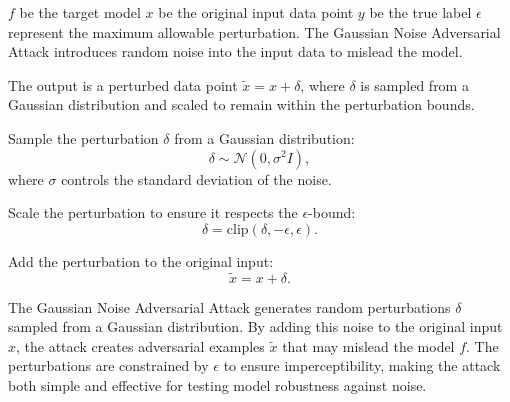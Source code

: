 \( f \) be the target model
\( x \) be the original input data point
\( y \) be the true label
\( \epsilon \) represent the maximum allowable perturbation. The Gaussian Noise Adversarial Attack introduces random noise into the input data to mislead the model.

The output is a perturbed data point \( \tilde{x} = x + \delta \), where \( \delta \) is sampled from a Gaussian distribution and scaled to remain within the perturbation bounds.

Sample the perturbation \( \delta \) from a Gaussian distribution:
   \[
   \delta \sim \mathcal{N}(0, \sigma^2 I),
   \]
   where \( \sigma \) controls the standard deviation of the noise.

Scale the perturbation to ensure it respects the \( \epsilon \)-bound:
   \[
   \delta = \text{clip}(\delta, -\epsilon, \epsilon).
   \]

Add the perturbation to the original input:
   \[
   \tilde{x} = x + \delta.
   \]

The Gaussian Noise Adversarial Attack generates random perturbations \( \delta \) sampled from a Gaussian distribution. By adding this noise to the original input \( x \), the attack creates adversarial examples \( \tilde{x} \) that may mislead the model \( f \). The perturbations are constrained by \( \epsilon \) to ensure imperceptibility, making the attack both simple and effective for testing model robustness against noise.
